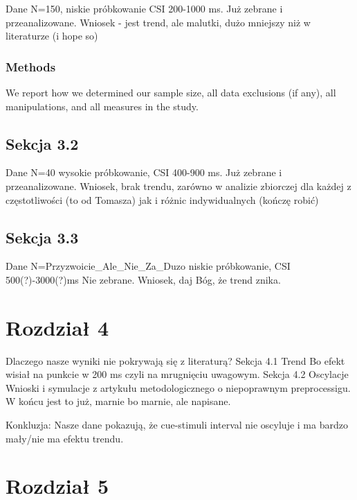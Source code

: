 \documentclass[
  man,draftall]{apa6}
\begin{document}
Dane N=150, niskie próbkowanie CSI 200-1000 ms. Już zebrane i przeanalizowane.
Wniosek - jest trend, ale malutki, dużo mniejszy niż w literaturze (i hope so)

\hypertarget{methods}{%
\subsubsection{Methods}\label{methods}}

We report how we determined our sample size, all data exclusions (if any), all manipulations, and all measures in the study.

\hypertarget{sekcja-3.2}{%
\subsection{Sekcja 3.2}\label{sekcja-3.2}}

Dane N=40 wysokie próbkowanie, CSI 400-900 ms. Już zebrane i przeanalizowane. Wniosek, brak trendu, zarówno w analizie zbiorczej dla każdej z częstotliwości (to od Tomasza) jak i różnic indywidualnych (kończę robić)

\hypertarget{sekcja-3.3}{%
\subsection{Sekcja 3.3}\label{sekcja-3.3}}

Dane N=Przyzwoicie\_Ale\_Nie\_Za\_Duzo niskie próbkowanie, CSI 500(?)-3000(?)ms Nie zebrane.
Wniosek, daj Bóg, że trend znika.

\hypertarget{rozdziaux142-4}{%
\section{Rozdział 4}\label{rozdziaux142-4}}

Dlaczego nasze wyniki nie pokrywają się z literaturą?
Sekcja 4.1 Trend
Bo efekt wisiał na punkcie w 200 ms czyli na mrugnięciu uwagowym.
Sekcja 4.2 Oscylacje
Wnioski i symulacje z artykułu metodologicznego o niepoprawnym preprocessigu. W końcu jest to już, marnie bo marnie, ale napisane.

Konkluzja: Nasze dane pokazują, że cue-stimuli interval nie oscyluje i ma bardzo mały/nie ma efektu trendu.

\hypertarget{rozdziaux142-5}{%
\section{Rozdział 5}\label{rozdziaux142-5}}
\end{document}
